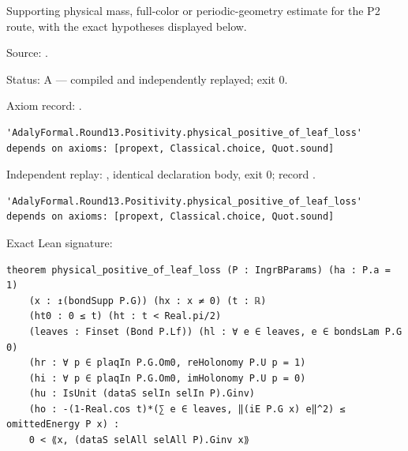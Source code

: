 \begin{theorem}[bp-466]
\label{bp-466}
\leanok
Supporting physical mass, full-color or periodic-geometry estimate for the P2 route, with the exact hypotheses displayed below.

\par Source: \texttt{}.
\par Status: A — compiled and independently replayed; exit 0.
\par Axiom record: \texttt{}.
\begin{verbatim}
'AdalyFormal.Round13.Positivity.physical_positive_of_leaf_loss' depends on axioms: [propext, Classical.choice, Quot.sound]
\end{verbatim}
\par Independent replay: \texttt{}, identical declaration body, exit 0; record \texttt{}.
\begin{verbatim}
'AdalyFormal.Round13.Positivity.physical_positive_of_leaf_loss' depends on axioms: [propext, Classical.choice, Quot.sound]
\end{verbatim}
\par Exact Lean signature:
\begin{verbatim}
theorem physical_positive_of_leaf_loss (P : IngrBParams) (ha : P.a = 1)
    (x : ↥(bondSupp P.G)) (hx : x ≠ 0) (t : ℝ)
    (ht0 : 0 ≤ t) (ht : t < Real.pi/2)
    (leaves : Finset (Bond P.Lf)) (hl : ∀ e ∈ leaves, e ∈ bondsLam P.G 0)
    (hr : ∀ p ∈ plaqIn P.G.Om0, reHolonomy P.U p = 1)
    (hi : ∀ p ∈ plaqIn P.G.Om0, imHolonomy P.U p = 0)
    (hu : IsUnit (dataS selIn selIn P).Ginv)
    (ho : -(1-Real.cos t)*(∑ e ∈ leaves, ‖(iE P.G x) e‖^2) ≤ omittedEnergy P x) :
    0 < ⟪x, (dataS selAll selAll P).Ginv x⟫
\end{verbatim}
\end{theorem}

